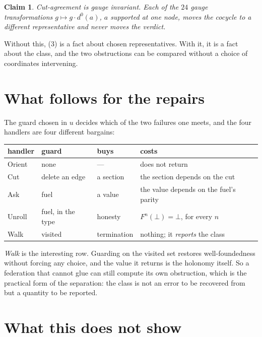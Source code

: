 \documentclass[11pt,a4paper]{article}
\newtheorem{claim}{Claim}
\begin{document}
\begin{claim}
Cut-agreement is gauge invariant. Each of the $24$ gauge transformations
$g \mapsto g \cdot d^0(a)$, $a$ supported at one node, moves the cocycle to a
different representative and never moves the verdict.
\end{claim}

Without this, (3) is a fact about chosen representatives. With it, it is a fact about
the class, and the two obstructions can be compared without a choice of coordinates
intervening.

\section{What follows for the repairs}

The guard chosen in $u$ decides which of the two failures one meets, and the four
handlers are four different bargains:

\begin{center}
\begin{tabular}{llll}
\toprule
\textbf{handler} & \textbf{guard} & \textbf{buys} & \textbf{costs} \\
\midrule
Orient & none & --- & does not return \\
Cut    & delete an edge & a section & the section depends on the cut \\
Ask    & fuel & a value & the value depends on the fuel's parity \\
Unroll & fuel, in the type & honesty & $F^n(\bot) = \bot$, for every $n$ \\
Walk   & visited & termination & nothing; it \emph{reports} the class \\
\bottomrule
\end{tabular}
\end{center}

\emph{Walk} is the interesting row. Guarding on the visited set restores
well-foundedness without forcing any choice, and the value it returns is the
holonomy itself. So a federation that cannot glue can still compute its own
obstruction, which is the practical form of the separation: the class is not an
error to be recovered from but a quantity to be reported.

\section{What this does not show}
\end{document}
